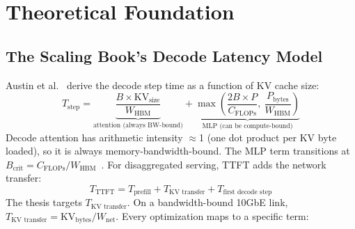 \documentclass[11pt]{article}
\begin{document}
\section{Theoretical Foundation}

\subsection{The Scaling Book's Decode Latency Model}

Austin et al.~\cite{scaling_book} derive the decode step time as a function of KV cache size:
\begin{equation}
T_{\text{step}} = \underbrace{\frac{B \times \text{KV}_{\text{size}}}{W_{\text{HBM}}}}_{\text{attention (always BW-bound)}} + \underbrace{\max\!\left(\frac{2B \times P}{C_{\text{FLOPs}}},\ \frac{P_{\text{bytes}}}{W_{\text{HBM}}}\right)}_{\text{MLP (can be compute-bound)}}
\label{eq:step}
\end{equation}
Decode attention has arithmetic intensity $\approx$1 (one dot product per KV byte loaded), so it is always memory-bandwidth-bound. The MLP term transitions at $B_{\text{crit}} = C_{\text{FLOPs}} / W_{\text{HBM}}$~\cite{scaling_book}. For disaggregated serving, TTFT adds the network transfer:
\begin{equation}
T_{\text{TTFT}} = T_{\text{prefill}} + T_{\text{KV transfer}} + T_{\text{first decode step}}
\label{eq:ttft}
\end{equation}
The thesis targets $T_{\text{KV transfer}}$. On a bandwidth-bound 10GbE link, $T_{\text{KV transfer}} = \text{KV}_{\text{bytes}} / W_{\text{net}}$. Every optimization maps to a specific term:
\end{document}
